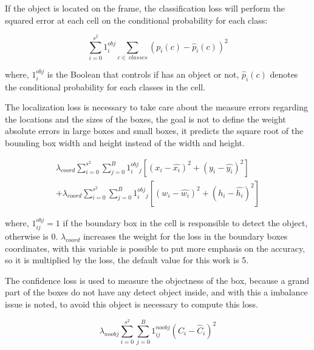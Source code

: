 If the object is located on the frame, the classification loss will perform the squared error at each cell on the conditional probability for each class: 

\begin{equation}
\label{eq:classification_loss}
    \sum_{i=0}^{s^2}1^{obj}_i \sum_{c\in~classes} \left ( p_i\left ( c \right )-\hat{p}_i\left ( c \right )\right )^2
\end{equation}

where, $1^{obj}_i$ is the Boolean that controls if has an object or not, $\hat{p}_i\left ( c \right )$ denotes the conditional probability for each classes in the cell.

The localization loss is necessary to take care about the measure errors regarding the locations and the sizes of the boxes, the goal is not to define the weight absolute errors in large boxes and small boxes, it predicts the square root of the bounding box width and height instead of the width and height. 

\begin{equation}
\label{eq:localization_loss}
\begin{aligned}
    \lambda_{coord}\sum_{i=0}^{s^2}\sum_{j=0}^{B}1^{obj}_i_j\left [ \left ( x_i - \hat{x_i} \right )^2  + (y_i-\hat{y_i})^2 \right ] \\ 
    + \lambda_{coord}\sum_{i=0}^{s^2}\sum_{j=0}^{B}1^{obj}_i_j\left [ \left ( w_i - \hat{w_i} \right )^2  + (h_i-\hat{h_i})^2 \right ] 
    \end{aligned}
\end{equation}

where, $1_{ij}^{obj} = 1$ if the boundary box in the cell is responsible to detect the object, otherwise is 0. $\lambda_{coord}$ increases the weight for the loss in the boundary boxes coordinates, with this variable is possible to put more emphasis on the accuracy, so it is multiplied by the loss, the default value for this work is 5. 

The confidence loss is used to measure the objectness of the box, because a grand part of the boxes do not have any detect object inside, and with this a imbalance issue is noted, to avoid this object is necessary to compute this loss. 

\begin{equation}
    \label{eq:confidence_loss}
    \lambda_{noobj}\sum_{i=0}^{s^2}\sum_{j=0}^{B}1^{noobj}_{ij}\left ( C_i - \hat{C}_i \right )^2
\end{equation}

